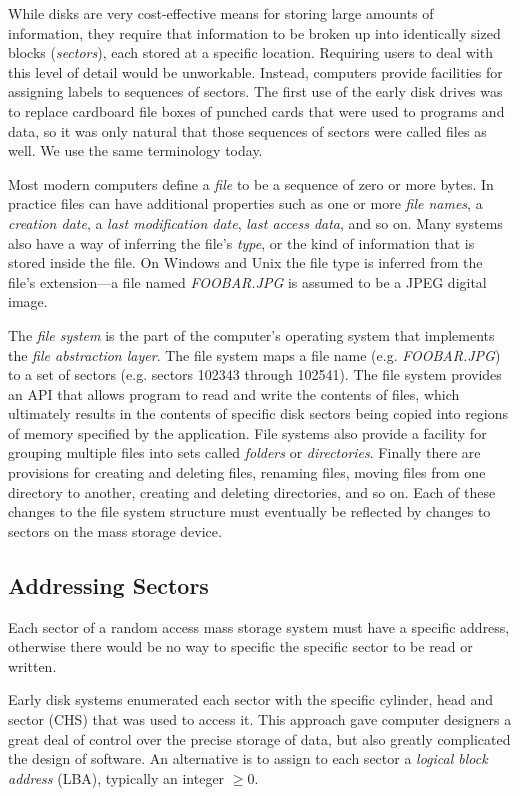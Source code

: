 While disks are very cost-effective means for storing large
amounts of information, they require that information to be broken up
into identically sized blocks (\emph{sectors}), each stored at a
specific location. Requiring users to deal with this level of detail
would be unworkable. Instead, computers provide facilities for
assigning labels to sequences of sectors. The first use of the early
disk drives was to replace cardboard file boxes of punched cards that
were used to programs and data, so it was only natural that those
sequences of sectors were called files as well. We use the same
terminology today.

Most modern computers define a \emph{file} to be a sequence of zero or more
bytes. In practice files can have additional properties such as one or
more \emph{file names}, a \emph{creation date}, a \emph{last modification date},
\emph{last access data}, and so on. Many systems also have a way of
inferring the file's \emph{type}, or the kind of information that is
stored inside the file. On Windows and Unix  the file type is
inferred from the file's extension---a file named
\emph{FOOBAR.JPG} is assumed to be a JPEG digital image.

The \emph{file system} is the part of the computer's operating system
that implements the \emph{file abstraction layer}. The file
system maps a file name (e.g. \emph{FOOBAR.JPG}) to a set of
sectors (e.g. sectors 102343 through 102541). The file system provides
an API that allows program to read and write the contents of
files, which ultimately results in the contents of specific disk sectors being
copied into regions of memory specified by the application. File
systems also provide a
facility for grouping multiple files into sets called \emph{folders}
or \emph{directories}. Finally there are provisions for creating and deleting files, renaming
files, moving files from one directory to another, creating and
deleting directories, and so on. Each of these changes to the file
system structure must eventually be reflected by changes to sectors on
the mass storage device.


\subsection{Addressing Sectors}
Each sector of a random access mass storage system must have a
specific address, otherwise there would be no way to specific the
specific sector to be read or written.

Early disk systems enumerated each sector with the specific cylinder,
head and sector (CHS) that was used to access it. This approach gave
computer designers a great deal of control over the precise storage of
data, but also greatly complicated the design of software. An
alternative is to assign to each sector a \emph{logical block address}
(LBA), typically an integer $\ge0$.


